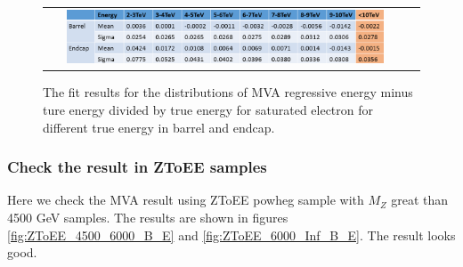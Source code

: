 \begin{figure}[bh]
  \begin{center}
    \begin{tabular}{cc}
      \includegraphics[width=0.9\textwidth]{chapters/Zprime/Saturation/images/FlatPt/Result/different_energy.png}
    \end{tabular}
    \caption{ The fit results for the distributions of MVA regressive energy minus ture energy divided by true energy for saturated electron for different true energy in barrel and endcap.}
    \label{fig:result_energy}
  \end{center}
\end{figure}

\subsubsection{Check the result in ZToEE samples}

Here we check the MVA result using ZToEE powheg sample with $M_{Z}$ great than 4500 GeV samples. The results are shown in figures \ref{fig:ZToEE_4500_6000_B_E} and \ref{fig:ZToEE_6000_Inf_B_E}. The result looks good.

